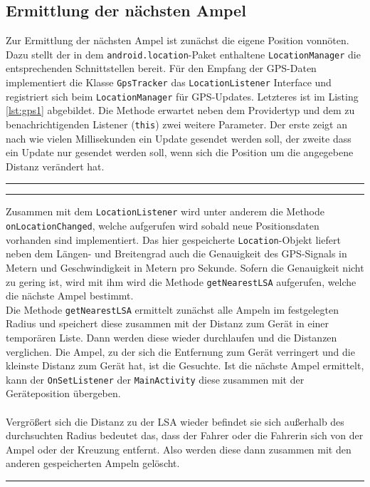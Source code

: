 \subsection{Ermittlung der nächsten Ampel}
Zur Ermittlung der nächsten Ampel ist zunächst die eigene Position vonnöten. Dazu stellt der in dem \texttt{android.location}-Paket enthaltene \texttt{LocationManager} die entsprechenden Schnittstellen bereit. Für den Empfang der \gls{GPS}-Daten implementiert die Klasse \texttt{GpsTracker} das \texttt{LocationListener} Interface und registriert sich beim \texttt{LocationManager} für \gls{GPS}-Updates.
Letzteres ist im Listing \ref{lst:gps1} abgebildet. Die Methode erwartet neben dem Providertyp und dem zu benachrichtigenden Listener (\texttt{this}) zwei weitere Parameter. Der erste zeigt an nach wie vielen Millisekunden ein Update gesendet werden soll, der zweite dass ein Update nur gesendet werden soll, wenn sich die Position um die angegebene Distanz verändert hat.
\begin{center}
\rule{35em}{0.5pt}

\rule{35em}{0.5pt}
\end{center}
Zusammen mit dem \texttt{LocationListener} wird unter anderem die Methode \texttt{onLocationChanged}, welche aufgerufen wird sobald neue Positionsdaten vorhanden sind implementiert. Das hier gespeicherte \texttt{Location}-Objekt liefert neben dem Längen- und Breitengrad auch die Genauigkeit des \gls{GPS}-Signals in Metern und Geschwindigkeit in Metern pro Sekunde. Sofern die Genauigkeit nicht zu gering ist, wird mit ihm wird die Methode \texttt{getNearestLSA} aufgerufen, welche die nächste Ampel bestimmt.\\
Die Methode \texttt{getNearestLSA} ermittelt zunächst alle Ampeln im festgelegten Radius und speichert diese zusammen mit der Distanz zum Gerät in einer temporären Liste. Dann werden diese wieder durchlaufen und die Distanzen verglichen. Die Ampel, zu der sich die Entfernung zum Gerät verringert und die kleinste Distanz zum Gerät hat, ist die Gesuchte. Ist die nächste Ampel ermittelt, kann der \texttt{OnSetListener} der \texttt{MainActivity} diese zusammen mit der Geräteposition übergeben. \\\\
Vergrößert sich die Distanz zu der \gls{LSA} wieder befindet sie sich außerhalb des durchsuchten Radius bedeutet das, dass der Fahrer oder die Fahrerin sich von der Ampel oder der Kreuzung entfernt. Also werden diese dann zusammen mit den anderen gespeicherten Ampeln gelöscht. 
\clearpage
\begin{center}

\rule{35em}{0.5pt}
\end{center}
%
%
